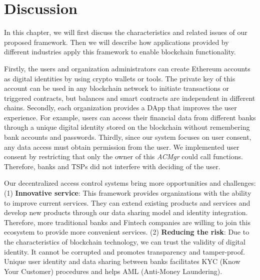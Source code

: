\chapter{Discussion}
\label{chapter:discussion}

In this chapter, we will first discuss the characteristics and related issues of our proposed framework. Then we will describe how applications provided by different industries apply this framework to enable blockchain functionality.
\par 

Firstly, the users and organization administrators can create Ethereum accounts as digital identities by using crypto wallets or tools. The private key of this account can be used in any blockchain network to initiate transactions or triggered contracts, but balances and smart contracts are independent in different chains. Secondly, each organization provides a DApp that improves the user experience. For example, users can access their financial data from different banks through a unique digital identity stored on the blockchain without remembering bank accounts and passwords. Thirdly, since our system focuses on user consent, any data access must obtain permission from the user. We implemented user consent by restricting that only the owner of this \textit{ACMgr} could call functions. Therefore, banks and TSPs did not interfere with deciding of the user.
\par 

Our decentralized access control systems bring more opportunities and challenges: (1) \textbf{Innovative service}: This framework provides organizations with the ability to improve current services. They can extend existing products and services and develop new products through our data sharing model and identity integration. Therefore, more traditional banks and Fintech companies are willing to join this ecosystem to provide more convenient services. (2) \textbf{Reducing the risk}: Due to the characteristics of blockchain technology, we can trust the validity of digital identity. It cannot be corrupted and promotes transparency and tamper-proof. Unique user identity and data sharing between banks facilitates KYC (Know Your Customer) procedures and helps AML (Anti-Money Laundering).

